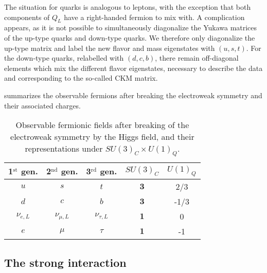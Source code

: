     The situation for quarks is analogous to leptons, with the exception that both components
    of $Q_L$ have a right-handed fermion to mix with. A complication appears, as
    it is not possible to simultaneously diagonalize the Yukawa matrices of the up-type
    quarks and down-type quarks. We therefore only diagonalize the up-type matrix and
    label the new flavor and mass eigenstates with $(u,s,t)$. For the down-type quarks,
    relabelled with $(d,c,b)$, there remain off-diagonal elements which mix the
    different flavor eigenstates, necessary to describe the data and corresponding to the
    so-called CKM matrix.

     summarizes the observable
    fermions after breaking the electroweak symmetry and their associated charges.

    \begin{table}[h]
        \centering
        \begin{tabular}{|ccc||cc|}
            \hline
            1$^\text{st}$ gen. & 2$^\text{nd}$ gen. & 3$^\text{rd}$ gen.  & $SU(3)_C$ & $U(1)_Q$  \\
            \hline
            \hline
            $u$                & $s$                & $t$                 & $\mathbf{3}$ &  2/3 \\
            $d$                & $c$                & $b$                 & $\mathbf{3}$ & -1/3 \\
            \hline
            \hline
            $\nu_{e,L}$        & $\nu_{\mu,L}$      & $\nu_{\tau,L}$      & $\mathbf{1}$ &  0   \\
            $e$                & $\mu$              & $\tau$              & $\mathbf{1}$ & -1   \\
            \hline
        \end{tabular}
        \caption{Observable fermionic fields after breaking of the electroweak symmetry
        by the Higgs field, and their representations under $SU(3)_C \times U(1)_Q$.}
        \label{tab:StandardModelFieldsAfterElectroweakBreaking}
    \end{table}

    \subsection{The strong interaction \label{sec:strongInteraction}}

